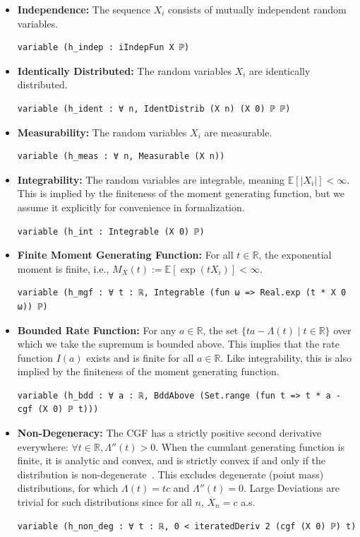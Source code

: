 \documentclass{article}
\newcommand{\E}{\mathbb{E}}
\newcommand{\R}{\mathbb{R}}
\begin{document}
\begin{itemize}
  \item \textbf{Independence:} The sequence $X_i$ consists of mutually independent random variables.
\begin{lstlisting}
variable (h_indep : iIndepFun X ℙ)
\end{lstlisting}
  \item \textbf{Identically Distributed:} The random variables $X_i$ are identically distributed.
\begin{lstlisting}
variable (h_ident : ∀ n, IdentDistrib (X n) (X 0) ℙ ℙ)
\end{lstlisting}
  \item \textbf{Measurability:} The random variables $X_i$ are measurable.
\begin{lstlisting}
variable (h_meas : ∀ n, Measurable (X n))
\end{lstlisting}

  \item \textbf{Integrability:} The random variables are integrable, meaning $\E[|X_i|] < \infty$. This is implied by the finiteness of the moment generating function, but we assume it explicitly for convenience in formalization.
\begin{lstlisting}
variable (h_int : Integrable (X 0) ℙ)
\end{lstlisting}

  \item \textbf{Finite Moment Generating Function:} For all $t \in \R$, the exponential moment is finite, i.e., $M_{X}(t) := \E[\exp(t X_i)] < \infty$.
\begin{lstlisting}
variable (h_mgf : ∀ t : ℝ, Integrable (fun ω => Real.exp (t * X 0 ω)) ℙ)
\end{lstlisting}

  \item \textbf{Bounded Rate Function:} For any $a \in \R$, the set $\{ta - \Lambda(t) \mid t \in \R\}$ over which we take the supremum is bounded above. This implies that the rate function $I(a)$ exists and is finite for all $a \in \R$. Like integrability, this is also implied by the finiteness of the moment generating function.
\begin{lstlisting}
variable (h_bdd : ∀ a : ℝ, BddAbove (Set.range (fun t => t * a - cgf (X 0) ℙ t)))
\end{lstlisting}

  \item \textbf{Non-Degeneracy:} The CGF has a strictly positive second derivative everywhere: $\forall t \in \R, \Lambda''(t) > 0$. When the cumulant generating function is finite, it is analytic and convex, and is strictly convex if and only if the distribution is non-degenerate~\cite{dembo1998large}. This excludes degenerate (point mass) distributions, for which $\Lambda(t) = tc$ and $\Lambda''(t) = 0$.
    Large Deviations are trivial for such distributions since for all $n$, $\overline{X}_n = c$ a.s.
\begin{lstlisting}
variable (h_non_deg : ∀ t : ℝ, 0 < iteratedDeriv 2 (cgf (X 0) ℙ) t)
\end{lstlisting}


\end{itemize}
\end{document}
